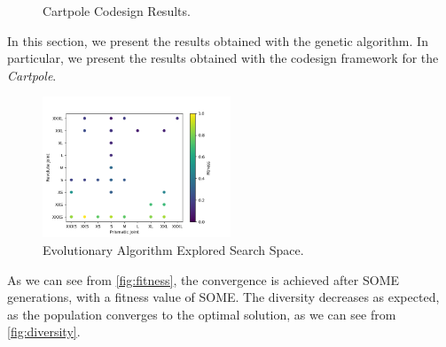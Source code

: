 \begin{figure}[h]
    \centering
    \caption{Cartpole Codesign Results.}
\end{figure}

In this section, we present the results obtained with the genetic algorithm. In particular, we present the results obtained with the codesign
framework for the \textit{Cartpole}.

\begin{figure}
    \centering
    \caption{Evolutionary Algorithm Explored Search Space.}
    \label{fig:searchspace}
    \includegraphics[width=0.5\textwidth]{Images/search_space.png}
\end{figure}

As we can see from \cref{fig:fitness}, the convergence is achieved after SOME generations, with a fitness value of SOME. The diversity decreases as expected, as the population converges to the optimal solution, as we can see from \cref{fig:diversity}.